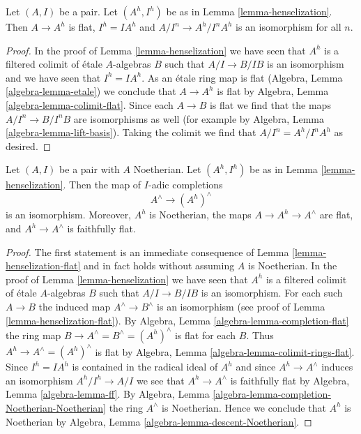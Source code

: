 \begin{lemma}
\label{lemma-henselization-flat}
Let $(A, I)$ be a pair. Let $(A^h, I^h)$ be as in 
Lemma \ref{lemma-henselization}. Then $A \to A^h$ is flat,
$I^h = IA^h$ and $A/I^n \to A^h/I^nA^h$ is an isomorphism
for all $n$.
\end{lemma}

\begin{proof}
In the proof of Lemma \ref{lemma-henselization} we have seen that
$A^h$ is a filtered colimit of \'etale $A$-algebras $B$ such that
$A/I \to B/IB$ is an isomorphism and we have seen that
$I^h = IA^h$. As an \'etale ring map is flat
(Algebra, Lemma \ref{algebra-lemma-etale}) we conclude that
$A \to A^h$ is flat by Algebra, Lemma \ref{algebra-lemma-colimit-flat}.
Since each $A \to B$ is flat we find that the maps
$A/I^n \to B/I^nB$ are isomorphisms as well (for example by
Algebra, Lemma \ref{algebra-lemma-lift-basis}).
Taking the colimit we find that $A/I^n = A^h/I^nA^h$
as desired.
\end{proof}

\begin{lemma}
\label{lemma-henselization-Noetherian-pair}
Let $(A, I)$ be a pair with $A$ Noetherian.  Let $(A^h, I^h)$ be as in 
Lemma \ref{lemma-henselization}. Then the map of $I$-adic completions
$$
A^\wedge \to (A^h)^\wedge
$$
is an isomorphism. Moreover, $A^h$ is Noetherian, the maps
$A \to A^h \to A^\wedge$ are flat, and $A^h \to A^\wedge$ is
faithfully flat.
\end{lemma}

\begin{proof}
The first statement is an immediate consequence of
Lemma \ref{lemma-henselization-flat}
and in fact holds without assuming $A$ is Noetherian.
In the proof of Lemma \ref{lemma-henselization} we have seen that
$A^h$ is a filtered colimit of \'etale $A$-algebras $B$ such that
$A/I \to B/IB$ is an isomorphism. For each such $A \to B$
the induced map $A^\wedge \to B^\wedge$ is an isomorphism
(see proof of Lemma \ref{lemma-henselization-flat}).
By Algebra, Lemma \ref{algebra-lemma-completion-flat} the ring map
$B \to A^\wedge = B^\wedge = (A^h)^\wedge$ is flat for each $B$.
Thus $A^h \to A^\wedge = (A^h)^\wedge$ is flat by
Algebra, Lemma \ref{algebra-lemma-colimit-rings-flat}.
Since $I^h = IA^h$ is contained in the radical ideal of $A^h$
and since $A^h \to A^\wedge$ induces an isomorphism $A^h/I^h \to A/I$
we see that $A^h \to A^\wedge$ is faithfully flat by
Algebra, Lemma \ref{algebra-lemma-ff}.
By Algebra, Lemma \ref{algebra-lemma-completion-Noetherian-Noetherian}
the ring $A^\wedge$ is Noetherian.
Hence we conclude that $A^h$ is Noetherian by
Algebra, Lemma \ref{algebra-lemma-descent-Noetherian}.
\end{proof}

